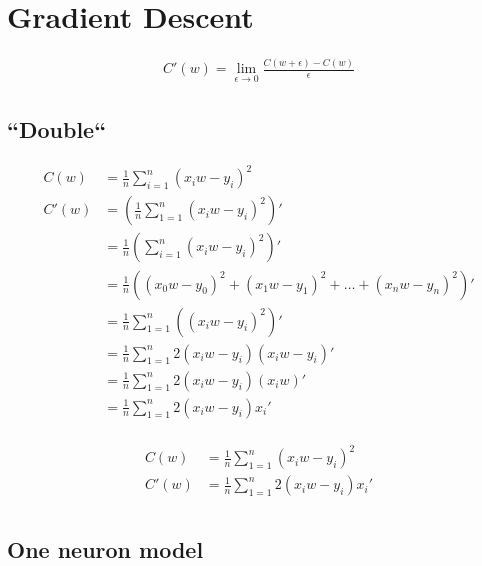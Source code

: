 \documentclass{article}
\begin{document}
\section{Gradient Descent}
\def\avgsum[#1,#2]{\frac{1}{#2}\sum_{#1=1}^{#2}}

\begin{align}
	C'(w) = \lim_{\epsilon \to 0}\frac{C(w + \epsilon) - C(w)}{\epsilon}
\end{align}

\subsection{``Double``}

\begin{align}
	C(w)  &= \avgsum[i,n](x_iw - y_i)^2 \\  
	C'(w) &= \left(\avgsum[1,n](x_iw - y_i)^2\right)' \\
		  &= \frac{1}{n}\left(\sum_{i=1}^{n}(x_iw - y_i)^2\right)' \\
		  &= \frac{1}{n}\left((x_0w - y_0)^2 + (x_1w - y_1)^2 + \hdots+(x_nw - y_n)^2\right)' \\
		  &= \avgsum[1,n]\left((x_iw - y_i)^2\right)' \\
		  &= \avgsum[1,n]2(x_iw - y_i)\left(x_iw - y_i\right)' \\
		  &= \avgsum[1,n]2(x_iw - y_i)\left(x_iw\right)' \\
		  &= \avgsum[1,n]2(x_iw - y_i)x_i' \\
\end{align}

\begin{align}
	C(w)  &= \avgsum[1,n](x_iw - y_i)^2 \\  
	C'(w) &= \avgsum[1,n]2(x_iw - y_i)x_i' \\
\end{align}

\subsection{One neuron model}

\def\d{1.5}

\begin{center}
\end{center}
\end{document}
